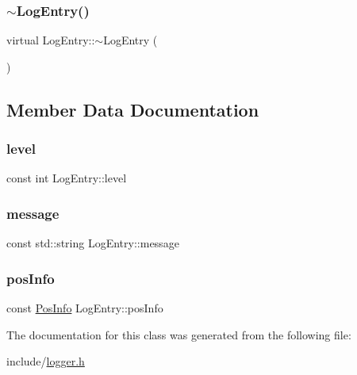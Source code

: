 \mbox{\label{classLogEntry_a835d70a7c0e233eea081c4540b2b959d}} 
\subsubsection{\texorpdfstring{$\sim$\+Log\+Entry()}{~LogEntry()}}
{\footnotesize\ttfamily virtual Log\+Entry\+::$\sim$\+Log\+Entry (\begin{DoxyParamCaption}{ }\end{DoxyParamCaption})\hspace{0.3cm}{\ttfamily [virtual]}}



\subsection{Member Data Documentation}
\mbox{\label{classLogEntry_a8bb959695c7dfe5eaf19f70fdc3f8a71}} 
\subsubsection{\texorpdfstring{level}{level}}
{\footnotesize\ttfamily const int Log\+Entry\+::level}

\mbox{\label{classLogEntry_a7ad3f1e2f6f00453e0c0bafc6ba5dfa8}} 
\subsubsection{\texorpdfstring{message}{message}}
{\footnotesize\ttfamily const std\+::string Log\+Entry\+::message}

\mbox{\label{classLogEntry_a0918b72d75e039af6a03e743f8615ebc}} 
\subsubsection{\texorpdfstring{pos\+Info}{posInfo}}
{\footnotesize\ttfamily const \hyperlink{classPosInfo}{Pos\+Info} Log\+Entry\+::pos\+Info}



The documentation for this class was generated from the following file\+:\begin{DoxyCompactItemize}
\item 
include/\hyperlink{logger_8h}{logger.\+h}\end{DoxyCompactItemize}
